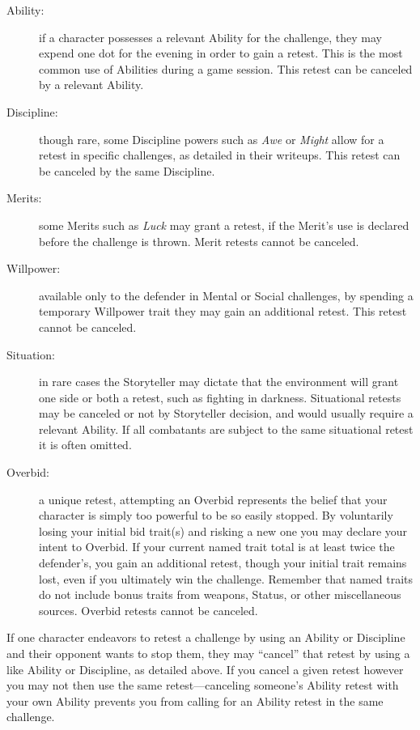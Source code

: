 \begin{description}
	\item[Ability:] if a character possesses a relevant Ability for the challenge, they may expend one 
	dot for the evening in order to gain a retest.  This is the most common use of Abilities during a 
	game session.  This retest can be canceled by a relevant Ability.
	\item[Discipline:] though rare, some Discipline powers such as \emph{Awe} or \emph{Might} allow for 
	a retest in specific challenges, as detailed in their writeups.  This retest can be canceled by the 
	same Discipline.
	\item[Merits:] some Merits such as \emph{Luck} may grant a retest, if the Merit's use is declared 
	before the challenge is thrown.  Merit retests cannot be canceled.
	\item[Willpower:] available only to the defender in Mental or Social challenges, by spending a 
	temporary Willpower trait they may gain an additional retest.  This retest cannot be canceled.
	\item[Situation:] in rare cases the Storyteller may dictate that the environment will grant one side 
	or both a retest, such as fighting in darkness.  Situational retests may be canceled or not by 
	Storyteller decision, and would usually require a relevant Ability.  If all combatants are subject 
	to the same situational retest it is often omitted.
	\item[Overbid:] a unique retest, attempting an Overbid represents the belief that your character is 
	simply too powerful to be so easily stopped.  By voluntarily losing your initial bid trait(s) and risking 
	a new one you may declare your intent to Overbid.  If your current named trait total is at least twice 
	the defender's, you gain an additional retest, though your initial trait remains lost, even if you 
	ultimately win the challenge.  Remember that named traits do not include bonus traits from weapons, 
	Status, or other miscellaneous sources.  Overbid retests cannot be canceled.
\end{description}

\noindent If one character endeavors to retest a challenge by using an Ability or Discipline and their opponent wants 
to stop them, they may ``cancel'' that retest by using a like Ability or Discipline, as detailed above.  If you 
cancel a given retest however you may not then use the same retest---canceling someone's Ability retest with your 
own Ability prevents you from calling for an Ability retest in the same challenge.

